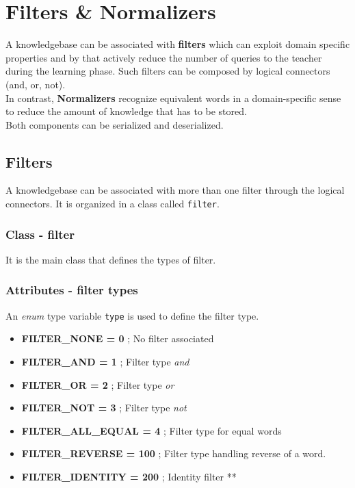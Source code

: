 \chapter{Filters \& Normalizers}
A knowledgebase can be associated with \textbf{filters} which can exploit domain specific properties and by that actively reduce the number of queries to the teacher during the learning phase. Such filters can be composed by logical connectors (and, or, not). \\
In contrast, \textbf{Normalizers} recognize equivalent words in a domain-specific sense to reduce the amount of knowledge that has to be stored. \\
Both components can be serialized and deserialized.

\section{Filters}

A knowledgebase can be associated with more than one filter through the logical connectors. It is organized in a class called \texttt{filter}.

\subsection{Class - filter}
It is the main class that defines the types of filter.

\subsection*{Attributes - filter types}
An \emph{enum} type variable \texttt{type} is used to define the filter type.
\begin{itemize}
 \item \textbf{FILTER\_NONE = 0} ; No filter associated
 \item \textbf{FILTER\_AND = 1} ; Filter type \emph{and}
 \item \textbf{FILTER\_OR = 2} ; Filter type \emph{or}
 \item \textbf{FILTER\_NOT = 3} ; Filter type \emph{not}
 \item \textbf{FILTER\_ALL\_EQUAL = 4} ; Filter type for equal words
 \item \textbf{FILTER\_REVERSE = 100} ; Filter type handling reverse of a word.
 \item \textbf{FILTER\_IDENTITY = 200} ; Identity filter **
\end{itemize}

